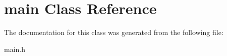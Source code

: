 \hypertarget{classmain}{}\section{main Class Reference}
\label{classmain}


The documentation for this class was generated from the following file\+:\begin{DoxyCompactItemize}
\item 
main.\+h\end{DoxyCompactItemize}
